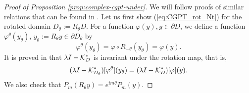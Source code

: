 \begin{proof}[Proof of Proposition \ref{prop:complex-cgpt-under}] We will follow proofs of similar relations that can be found in \cite{AGKLY11}.
Let us first show (\ref{eq:CGPT_rot_Nt}) for the rotated domain
$D_\theta:=R_\theta D$. For a function $\varphi(y), y\in
\partial D$, we define a function $\varphi^\theta(y_\theta)$,
$y_\theta := R_\theta y \in \partial D_\theta$ by
\begin{equation*}
\varphi^\theta(y_\theta) = \varphi \circ R_{-\theta} (y_\theta) =
\varphi(y).
\end{equation*}
It is proved in \cite{AGKLY11} that $\lambda I - \mathcal{K}^*_D$ is
invariant under the rotation map, that is,
\begin{equation}
(\lambda I - \mathcal{K}^*_{D_\theta})[\varphi^\theta] (y_\theta) =
(\lambda I - \mathcal{K}^*_{D})[\varphi](y). \label{eq:ImKrot}
\end{equation}
We also check that $P_m(R_\theta y) = e^{im\theta} P_m(y)$.


\end{proof}

